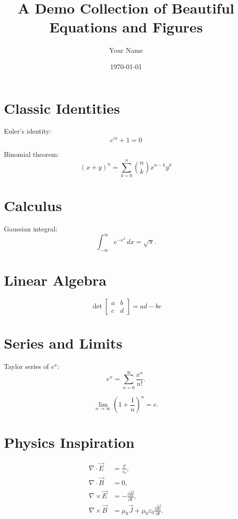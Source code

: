 \documentclass[12pt]{article}
\title{A Demo Collection of Beautiful Equations and Figures}
\author{Your Name}
\date{\today}
\begin{document}
\maketitle

\section*{Classic Identities}

Euler’s identity:
\[
e^{i\pi} + 1 = 0
\]

Binomial theorem:
\[
(x+y)^n = \sum_{k=0}^n \binom{n}{k} x^{n-k} y^k
\]

\section*{Calculus}

Gaussian integral:
\[
\int_{-\infty}^\infty e^{-x^2}\,dx = \sqrt{\pi}.
\]

\section*{Linear Algebra}

\[
\det\!\begin{bmatrix}
a & b \\
c & d
\end{bmatrix}
= ad - bc
\]

\section*{Series and Limits}

Taylor series of $e^x$:
\[
e^x = \sum_{n=0}^\infty \frac{x^n}{n!}.
\]

\[
\lim_{n\to\infty} \left(1 + \frac{1}{n}\right)^n = e.
\]

\section*{Physics Inspiration}

\begin{align*}
\nabla \cdot \vec{E} &= \frac{\rho}{\varepsilon_0}, \\
\nabla \cdot \vec{B} &= 0, \\
\nabla \times \vec{E} &= -\frac{\partial \vec{B}}{\partial t}, \\
\nabla \times \vec{B} &= \mu_0 \vec{J} + \mu_0\varepsilon_0 \frac{\partial \vec{E}}{\partial t}.
\end{align*}
\end{document}
